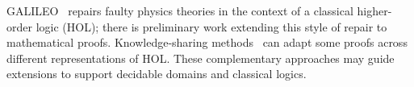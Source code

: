GALILEO~\cite{bundyreasoning} repairs faulty physics theories
in the context of a classical higher-order logic (HOL); there is preliminary work extending this
style of repair to mathematical proofs. 
Knowledge-sharing methods~\cite{tgck-cicm14} can adapt some proofs across different representations of HOL.
These complementary approaches may guide extensions to support decidable domains and classical logics.


